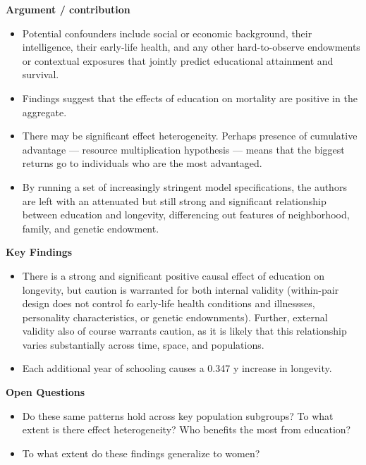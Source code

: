 \documentclass[
]{book}
\providecommand{\tightlist}{%
  \setlength{\itemsep}{0pt}\setlength{\parskip}{0pt}}
\begin{document}
\textbf{Argument / contribution}

\begin{itemize}
\tightlist
\item
  Potential confounders include social or economic background, their intelligence, their early-life health, and any other hard-to-observe endowments or contextual exposures that jointly predict educational attainment and survival.
\item
  Findings suggest that the effects of education on mortality are positive in the aggregate.\\
\item
  There may be significant effect heterogeneity. Perhaps presence of cumulative advantage --- resource multiplication hypothesis --- means that the biggest returns go to individuals who are the most advantaged.
\item
  By running a set of increasingly stringent model specifications, the authors are left with an attenuated but still strong and significant relationship between education and longevity, differencing out features of neighborhood, family, and genetic endowment.
\end{itemize}

\textbf{Key Findings}

\begin{itemize}
\tightlist
\item
  There is a strong and significant positive causal effect of education on longevity, but caution is warranted for both internal validity (within-pair design does not control fo early-life health conditions and illnessses, personality characteristics, or genetic endownments). Further, external validity also of course warrants caution, as it is likely that this relationship varies substantially across time, space, and populations.
\item
  Each additional year of schooling causes a 0.347 y increase in longevity.
\end{itemize}

\textbf{Open Questions}

\begin{itemize}
\tightlist
\item
  Do these same patterns hold across key population subgroups? To what extent is there effect heterogeneity? Who benefits the most from education?
\item
  To what extent do these findings generalize to women?
\end{itemize}
\end{document}
